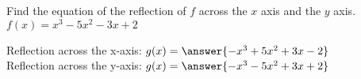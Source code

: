 \documentclass{ximera}
\author{David Kish}
\begin{document}
\begin{exercise}

Find the equation of the reflection of $f$ across the $x$ axis and the $y$ axis.\\

$f(x)=x^3-5x^2-3x+2$

Reflection across the x-axis: $g(x)=\answer{-x^3+5x^2+3x-2}$\\
Reflection across the y-axis: $g(x)=\answer{-x^3-5x^2+3x+2}$\\




\end{exercise}
\end{document}

